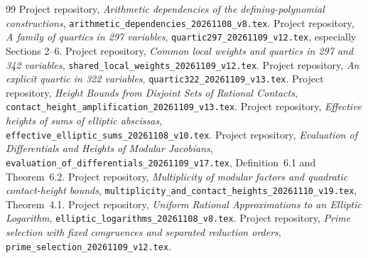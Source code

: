 \documentclass[11pt,a4paper]{article}
\begin{document}
\begin{thebibliography}{99}\small\setlength{\itemsep}{2pt}
 Project repository,
\emph{Arithmetic dependencies of the defining-polynomial constructions},
\nolinkurl{arithmetic_dependencies_20261108_v8.tex}.
 Project repository,
\emph{A family of quartics in 297 variables},
\nolinkurl{quartic297_20261109_v12.tex}, especially Sections 2--6.
 Project repository,
\emph{Common local weights and quartics in 297 and 342 variables},
\nolinkurl{shared_local_weights_20261109_v12.tex}.
 Project repository,
\emph{An explicit quartic in 322 variables},
\nolinkurl{quartic322_20261109_v13.tex}.
 Project repository,
\emph{Height Bounds from Disjoint Sets of Rational Contacts},
\nolinkurl{contact_height_amplification_20261109_v13.tex}.
 Project repository,
\emph{Effective heights of sums of elliptic abscissas},
\nolinkurl{effective_elliptic_sums_20261108_v10.tex}.
 Project repository,
\emph{Evaluation of Differentials and Heights of Modular Jacobians},
\nolinkurl{evaluation_of_differentials_20261109_v17.tex},
Definition~6.1 and Theorem~6.2.
 Project repository,
\emph{Multiplicity of modular factors and quadratic contact-height bounds},
\nolinkurl{multiplicity_and_contact_heights_20261110_v19.tex},
Theorem~4.1.
 Project repository,
\emph{Uniform Rational Approximations to an Elliptic Logarithm},
\nolinkurl{elliptic_logarithms_20261108_v8.tex}.
 Project repository,
\emph{Prime selection with fixed congruences and separated reduction orders},
\nolinkurl{prime_selection_20261109_v12.tex}.
\end{thebibliography}
\end{document}
